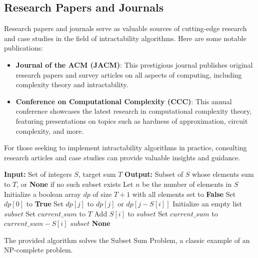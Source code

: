 \documentclass[12pt]{book} %
\begin{document}
\subsection{Research Papers and Journals}
Research papers and journals serve as valuable sources of cutting-edge research and case studies in the field of intractability algorithms. Here are some notable publications:

\begin{itemize}
    \item \textbf{Journal of the ACM (JACM)}: This prestigious journal publishes original research papers and survey articles on all aspects of computing, including complexity theory and intractability.
    \item \textbf{Conference on Computational Complexity (CCC)}: This annual conference showcases the latest research in computational complexity theory, featuring presentations on topics such as hardness of approximation, circuit complexity, and more.
\end{itemize}

For those seeking to implement intractability algorithms in practice, consulting research articles and case studies can provide valuable insights and guidance.

\FloatBarrier
\begin{algorithm}
\caption{Example Algorithm: Subset Sum Problem}
\begin{algorithmic}[1]
\State \textbf{Input:} Set of integers $S$, target sum $T$
\State \textbf{Output:} Subset of $S$ whose elements sum to $T$, or \textbf{None} if no such subset exists
\State Let $n$ be the number of elements in $S$
\State Initialize a boolean array $dp$ of size $T+1$ with all elements set to \textbf{False}
\State Set $dp[0]$ to \textbf{True}
        \State Set $dp[j]$ to $dp[j]$ or $dp[j - S[i]]$
    \EndFor
\EndFor
{}
    \State Initialize an empty list $subset$
    \State Set $current\_sum$ to $T$
            \State Add $S[i]$ to $subset$
            \State Set $current\_sum$ to $current\_sum - S[i]$
        \EndIf
    \EndFor
    \Return $subset$
\Else
    \Return \textbf{None}
\EndIf
\end{algorithmic}
\end{algorithm}
\FloatBarrier

The provided algorithm solves the Subset Sum Problem, a classic example of an NP-complete problem.
\end{document}
